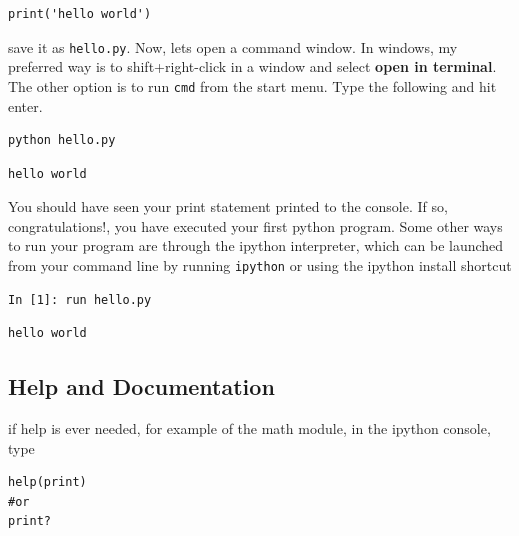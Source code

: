 \documentclass[%
oneside,                 %
final,                   %
10pt]{article}
\begin{document}
\begin{verbatim}
print('hello world')
\end{verbatim}

save it as \texttt{hello.py}. Now, lets open a command window. In windows, my preferred way is to shift+right-click in a window and select \textbf{open in terminal}. The other option is to run \texttt{cmd} from the start menu. Type the following and hit enter.

\begin{verbatim}
python hello.py
\end{verbatim}

\begin{verbatim}
hello world
\end{verbatim}

You should have seen your print statement printed to the console. If so, congratulations!, you have executed your first python program. Some other ways to run your program are through the ipython interpreter, which can be launched from your command line by running \texttt{ipython} or using the ipython install shortcut

\begin{verbatim}
In [1]: run hello.py
\end{verbatim}

\begin{verbatim}
hello world
\end{verbatim}


\subsection{Help and Documentation}

if help is ever needed, for example of the math module, in the ipython console, type

\begin{verbatim}
help(print)
#or
print?
\end{verbatim}
\end{document}
